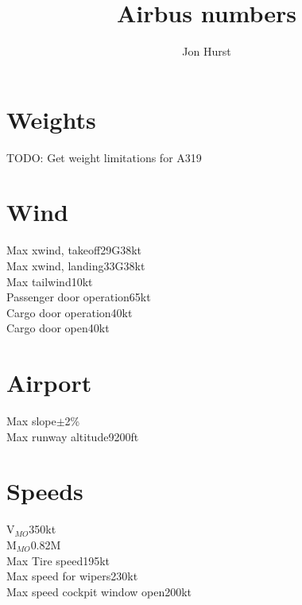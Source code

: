\documentclass[a4paper,twocolumn]{article}
\title{Airbus numbers}
\author{Jon Hurst}
\begin{document}
\section{Weights}
TODO: Get weight limitations for A319

\section{Wind}
Max xwind, takeoff\dotfill 29G38kt\\
Max xwind, landing\dotfill 33G38kt\\
Max tailwind\dotfill 10kt\\
Passenger door operation\dotfill 65kt\\
Cargo door operation\dotfill 40kt\\
Cargo door open\dotfill 40kt

\section{Airport}
Max slope\dotfill $\pm$2\%\\
Max runway altitude\dotfill 9200ft

\section{Speeds}
V$_{MO}$\dotfill 350kt\\
M$_{MO}$\dotfill 0.82M\\
Max Tire speed\dotfill 195kt\\
Max speed for wipers\dotfill 230kt\\
Max speed cockpit window open\dotfill 200kt
\end{document}
